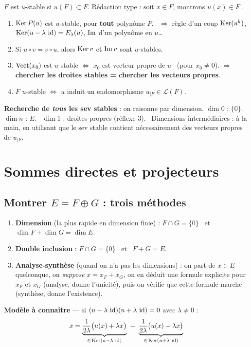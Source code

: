 \documentclass[10pt]{article}
\begin{document}
$F$ est $u$-stable si $u(F)\subset F$. Rédaction type : \og soit $x\in F$, montrons $u(x)\in F$ \fg.

\begin{enumerate}
\item $\operatorname{Ker} P(u)$ est $u$-stable, pour \textbf{tout} polynôme $P$. \ $\Rightarrow$ règle d'un coup
$\operatorname{Ker}(u^k)$, $\operatorname{Ker}(u-\lambda\,\operatorname{id})=E_\lambda(u)$, $\operatorname{Im}$ d'un polynôme en $u$\dots
\item Si $u\circ v=v\circ u$, alors $\operatorname{Ker} v$ et $\operatorname{Im} v$ sont $u$-stables.
\item $\operatorname{Vect}(x_0)$ est $u$-stable $\iff$ $x_0$ est vecteur propre de $u$ \ (pour $x_0\neq0$).
$\Rightarrow$ \textbf{chercher les droites stables = chercher les vecteurs propres}.
\item $F$ $u$-stable $\iff$ $u$ induit un endomorphisme $u_{|F}\in\mathcal{L}(F)$.
\end{enumerate}

\textbf{Recherche de \emph{tous} les sev stables} : on raisonne par dimension.
$\dim 0$ : $\{0\}$. \ $\dim n$ : $E$. \ $\dim 1$ : droites propres (réflexe 3).
\ Dimensions intermédiaires : à la main, en utilisant que le sev stable contient nécessairement
des vecteurs propres de $u_{|F}$.

\section{Sommes directes et projecteurs}

\subsection{Montrer $E=F\oplus G$ : trois méthodes}

\begin{enumerate}
\item \textbf{Dimension} (la plus rapide en dimension finie) :
$F\cap G=\{0\}$ \ et \ $\dim F+\dim G=\dim E$.
\item \textbf{Double inclusion} : $F\cap G=\{0\}$ \ et \ $F+G=E$.
\item \textbf{Analyse-synthèse} (quand on n'a pas les dimensions) : on part de $x\in E$ quelconque,
on \emph{suppose} $x=x_F+x_G$, on en déduit une formule explicite pour $x_F$ et $x_G$ (analyse,
donne l'unicité), puis on vérifie que cette formule marche (synthèse, donne l'existence).
\end{enumerate}

\textbf{Modèle à connaître} --- si $(u-\lambda\,\operatorname{id})(u+\lambda\,\operatorname{id})=0$ avec $\lambda\neq0$ :
\[x = \underbrace{\frac{1}{2\lambda}\big(u(x)+\lambda x\big)}_{\in\,\operatorname{Ker}(u-\lambda\,\operatorname{id})}
\ -\ \underbrace{\frac{1}{2\lambda}\big(u(x)-\lambda x\big)}_{\in\,\operatorname{Ker}(u+\lambda\,\operatorname{id})}\]
\end{document}
